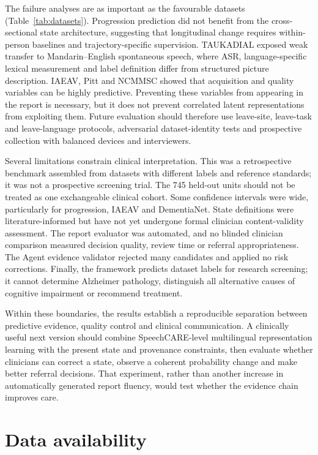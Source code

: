 \documentclass[pdflatex,sn-nature]{sn-jnl}
\begin{document}
The failure analyses are as important as the favourable datasets (Table~\ref{tab:datasets}). Progression prediction did not benefit from the cross-sectional state architecture, suggesting that longitudinal change requires within-person baselines and trajectory-specific supervision. TAUKADIAL exposed weak transfer to Mandarin--English spontaneous speech, where ASR, language-specific lexical measurement and label definition differ from structured picture description. IAEAV, Pitt and NCMMSC showed that acquisition and quality variables can be highly predictive. Preventing these variables from appearing in the report is necessary, but it does not prevent correlated latent representations from exploiting them. Future evaluation should therefore use leave-site, leave-task and leave-language protocols, adversarial dataset-identity tests and prospective collection with balanced devices and interviewers.

Several limitations constrain clinical interpretation. This was a retrospective benchmark assembled from datasets with different labels and reference standards; it was not a prospective screening trial. The 745 held-out units should not be treated as one exchangeable clinical cohort. Some confidence intervals were wide, particularly for progression, IAEAV and DementiaNet. State definitions were literature-informed but have not yet undergone formal clinician content-validity assessment. The report evaluator was automated, and no blinded clinician comparison measured decision quality, review time or referral appropriateness. The Agent evidence validator rejected many candidates and applied no risk corrections. Finally, the framework predicts dataset labels for research screening; it cannot determine Alzheimer pathology, distinguish all alternative causes of cognitive impairment or recommend treatment.

Within these boundaries, the results establish a reproducible separation between predictive evidence, quality control and clinical communication. A clinically useful next version should combine SpeechCARE-level multilingual representation learning with the present state and provenance constraints, then evaluate whether clinicians can correct a state, observe a coherent probability change and make better referral decisions. That experiment, rather than another increase in automatically generated report fluency, would test whether the evidence chain improves care.

\section*{Data availability}
\end{document}
